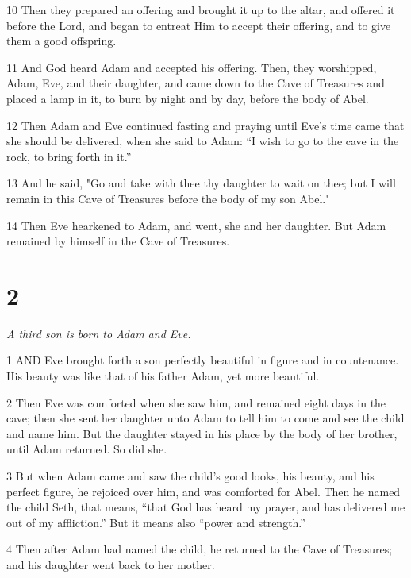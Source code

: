 \par 10 Then they prepared an offering and brought it up to the altar, and offered it before the Lord, and began to entreat Him to accept their offering, and to give them a good offspring.

\par 11 And God heard Adam and accepted his offering. Then, they worshipped, Adam, Eve, and their daughter, and came down to the Cave of Treasures and placed a lamp in it, to burn by night and by day, before the body of Abel.

\par 12 Then Adam and Eve continued fasting and praying until Eve's time came that she should be delivered, when she said to Adam: “I wish to go to the cave in the rock, to bring forth in it.”

\par 13 And he said, "Go and take with thee thy daughter to wait on thee; but I will remain in this Cave of Treasures before the body of my son Abel."

\par 14 Then Eve hearkened to Adam, and went, she and her daughter. But Adam remained by himself in the Cave of Treasures.

\chapter{2}

\par \textit{A third son is born to Adam and Eve.}

\par 1 AND Eve brought forth a son perfectly beautiful in figure and in countenance. His beauty was like that of his father Adam, yet more beautiful.

\par 2 Then Eve was comforted when she saw him, and remained eight days in the cave; then she sent her daughter unto Adam to tell him to come and see the child and name him. But the daughter stayed in his place by the body of her brother, until Adam returned. So did she.

\par 3 But when Adam came and saw the child's good looks, his beauty, and his perfect figure, he rejoiced over him, and was comforted for Abel. Then he named the child Seth, that means, “that God has heard my prayer, and has delivered me out of my affliction.” But it means also “power and strength.”

\par 4 Then after Adam had named the child, he returned to the Cave of Treasures; and his daughter went back to her mother.

